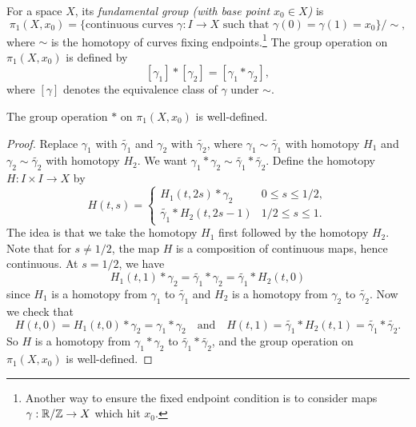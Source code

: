 \begin{definition}
  For a space $X$, its \emph{fundamental group (with base point $x_0 \in X$)}
  is
  \[
    \pi_1(X, x_0)
    = \{\text{continuous curves $\gamma : I \to X$ such that $\gamma(0) = \gamma(1) = x_0$}\} / {\sim},
  \]
  where $\sim$ is the homotopy of curves fixing
  endpoints.\footnote{Another way to ensure the fixed endpoint condition is to consider maps $\gamma : \mathbb{R} / \mathbb{Z} \to X$ which hit $x_0$.} The
  group operation on $\pi_1(X, x_0)$ is defined by
  \[
    [\gamma_1] * [\gamma_2] = [\gamma_1 * \gamma_2],
  \]
  where $[\gamma]$ denotes the equivalence class of
  $\gamma$ under $\sim$.
\end{definition}

\begin{prop}
  The group operation $*$ on $\pi_1(X, x_0)$ is well-defined.
\end{prop}

\begin{proof}
  Replace $\gamma_1$ with $\widetilde{\gamma_1}$
  and $\gamma_2$ with $\widetilde{\gamma_2}$, where
  $\gamma_1 \sim \widetilde{\gamma_1}$ with
  homotopy $H_1$ and
  $\gamma_2 \sim \widetilde{\gamma_2}$ with homotopy
  $H_2$. We want
  $\gamma_1 * \gamma_2 \sim \widetilde{\gamma_1} * \widetilde{\gamma_2}$.
  Define the homotopy $H : I \times I \to X$ by
  \[
    H(t, s) =
    \begin{cases}
      H_1(t, 2s) * \gamma_2 & 0 \le s \le 1/2, \\
      \widetilde{\gamma_1} * H_2(t, 2s - 1) & 1/2 \le s \le 1.
    \end{cases}
  \]
  The idea is that we take the homotopy $H_1$ first
  followed by the homotopy $H_2$. Note that
  for $s \ne 1 / 2$, the map $H$ is a composition
  of continuous maps, hence continuous. At
  $s = 1 / 2$, we have
  \[
    H_1(t, 1) * \gamma_2 =
    \widetilde{\gamma_1} * \gamma_2
    = \widetilde{\gamma_1} * H_2(t, 0)
  \]
  since $H_1$ is a homotopy from $\gamma_1$ to
  $\widetilde{\gamma_1}$ and $H_2$ is a homotopy
  from $\gamma_2$ to $\widetilde{\gamma_2}$.
  Now we check that
  \[
    H(t, 0) = H_1(t, 0) * \gamma_2
    = \gamma_1 * \gamma_2 \quad \text{and} \quad
    H(t, 1) = \widetilde{\gamma_1} * H_2(t, 1)
    = \widetilde{\gamma_1} * \widetilde{\gamma_2}.
  \]
  So $H$ is a homotopy from $\gamma_1 * \gamma_2$
  to $\widetilde{\gamma_1} * \widetilde{\gamma_2}$,
  and the group operation on
  $\pi_1(X, x_0)$ is well-defined.
\end{proof}
